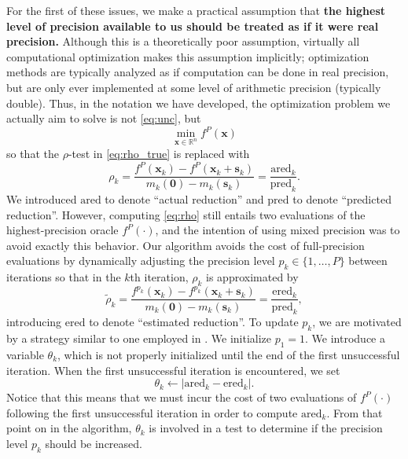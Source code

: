 \documentclass{article}
\newcommand{\xb}{\mathbf{x}}
\newcommand{\sbb}{\mathbf{s}}
\newcommand{\R}{\mathbb{R}}
\newcommand{\zero}{\mathbf{0}}
\newcommand{\trho}{\tilde\rho}
\newcommand{\ared}{\mathrm{ared}}
\newcommand{\pred}{\mathrm{pred}}
\newcommand{\ered}{\mathrm{ered}}
\begin{document}
For the first of these issues, we make a practical assumption that \textbf{the highest level of precision available to us should be treated as if it were real precision.}
Although this is a theoretically poor assumption, virtually all computational optimization makes this assumption implicitly; optimization methods are typically analyzed
as if computation can be done in real precision, but are only ever implemented at some level of arithmetic precision (typically double). 
Thus, in the notation we have developed, the optimization problem we actually aim to solve is not \eqref{eq:unc}, but 
\begin{equation}
\label{eq:unc_real}
 \displaystyle\min_{\xb\in\R^n} f^P(\xb)
\end{equation}
so that the $\rho$-test in \eqref{eq:rho_true} is replaced with
\begin{equation}
 \label{eq:rho}
 \rho_k=\displaystyle\frac{f^P(\xb_k)-f^P(\xb_k+\sbb_k)}{m_k(\zero)-m_k(\sbb_k)}=\displaystyle\frac{\ared_k}{\pred_k}.
\end{equation}
We introduced $\ared$ to denote ``actual reduction'' and $\pred$ to denote ``predicted reduction''. 
However, computing \eqref{eq:rho} still entails two evaluations of the highest-precision oracle $f^P(\cdot)$, and the intention of using mixed precision
was to avoid exactly this behavior. 
Our algorithm avoids the cost of full-precision evaluations 
by dynamically adjusting the precision level $p_k\in\{1,\dots,P\}$ between iterations so that in the $k$th iteration, $\rho_k$ is approximated by
\begin{equation}
 \label{eq:rho_observed}
 \trho_k=\displaystyle\frac{f^{p_k}(\xb_k)-f^{p_k}(\xb_k+\sbb_k)}{m_k(\zero)-m_k(\sbb_k)}=\displaystyle\frac{\ered_k}{\pred_k},
\end{equation}
introducing $\ered$ to denote ``estimated reduction''. 
To update $p_k$, we are motivated by a strategy similar to one employed in \cite{heinkenschlossvicente,Kouri2014InexactOF}.
We initialize $p_1=1$. 
We introduce a variable $\theta_k$, which is not properly initialized until the end of the first unsuccessful iteration. 
When the first unsuccessful iteration is encountered, we set
\begin{equation}
 \label{eq:theta_update}
 \theta_k\gets \left|\ared_k-\ered_k\right|.
\end{equation}
Notice that this means that we must incur the cost of two evaluations of $f^P(\cdot)$ following the first unsuccessful iteration
in order to compute $\ared_k$. 
From that point on in the algorithm, $\theta_k$ is involved in a test to determine if the precision level $p_k$ should be increased. 
\end{document}
